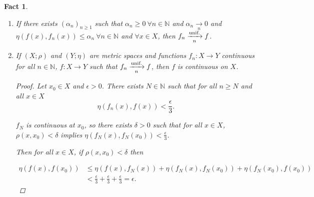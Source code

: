 \documentclass[12pt]{amsbook}
\newtheorem{fact}[theorem]{Fact}
\theoremstyle{definition}
\newcommand{\NN}{{\mathbb N}}
\newcommand{\ra}{\rightarrow} %
\begin{document}
\begin{fact} \
\begin{enumerate}
\item If there exists $(\alpha_n)_{n \geq 1}$ such that $\alpha_n \geq 0 \ \forall n \in \NN$ and $\alpha_n \xrightarrow[n]{} 0$ and $\eta(f(x), f_n(x)) \leq \alpha_n \ \forall n \in \NN$ and $\forall x \in X$, then $f_n \xrightarrow[n]{\textup{unif.}} f$.

\item If $(X; \rho)$ and $(Y; \eta)$ are metric spaces and functions $f_n: X \ra Y$ continuous for all $n \in \NN$, $f: X \ra Y$ such that $f_n \xrightarrow[n]{\textup{unif.}} f$, then $f$ is continuous on $X$.

\begin{proof}
Let $x_0 \in X$ and $\epsilon > 0$. There exists $N \in \NN$ such that for all $n \geq N$ and all $x \in X$
\begin{equation*} \eta(f_n(x),f(x)) < \frac{\epsilon}{3}. \end{equation*}


$f_N$ is continuous at $x_0$, so there exists $\delta > 0$ such that for all $x \in X$, $\rho(x, x_0) < \delta$ implies $\eta(f_N(x), f_N(x_0)) < \frac{\epsilon}{3}$.

Then for all $x \in X$, if $\rho(x, x_0) < \delta$ then

\begin{align*} 
\eta(f(x), f(x_0)) & \leq \eta(f(x), f_N(x)) + \eta(f_N(x), f_N(x_0)) + \eta(f_N(x_0), f(x_0)) \\
& < \frac{\epsilon}{3} + \frac{\epsilon}{3} + \frac{\epsilon}{3} = \epsilon.
\end{align*}
\end{proof}
\end{enumerate}
\end{fact}
\end{document}
